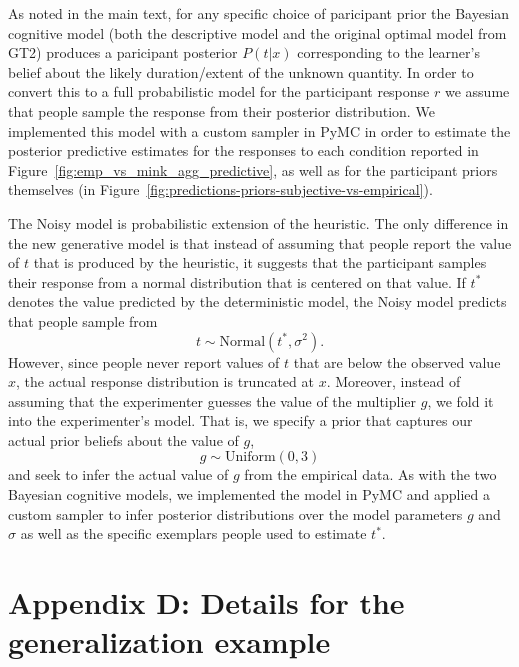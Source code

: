 As noted in the main text, for any specific choice of paricipant prior the Bayesian cognitive model (both the descriptive model and the original optimal model from GT2) produces a paricipant posterior $P(t|x)$ corresponding to the learner's belief about the likely duration/extent of the unknown quantity. In order to convert this to a full probabilistic model for the participant response $r$ we assume that people sample the response from their posterior distribution. We implemented this model with a custom sampler in PyMC in order to estimate the posterior predictive estimates for the responses to each condition reported in Figure~\ref{fig:emp_vs_mink_agg_predictive}, as well as for the participant priors themselves (in Figure~\ref{fig:predictions-priors-subjective-vs-empirical}). 

The Noisy \mink model is probabilistic extension of the \mink heuristic. The only difference in the new generative model is that instead of assuming that people report the value of $t$ that is produced by the \mink heuristic, it suggests that the participant samples their response from a normal distribution that is centered on that value. If $t^*$ denotes the value predicted by the deterministic \mink model, the Noisy \mink model predicts that people sample from 
\begin{equation}
t \sim \mbox{Normal}(t^*,\sigma^2).
\end{equation}
However, since people never report values of $t$ that are below the observed value $x$, the actual response distribution is truncated at $x$. Moreover, instead of assuming that the experimenter guesses the value of the multiplier $g$, we fold it into the experimenter's model. That is, we specify a prior that captures our actual prior beliefs about the value of $g$, 
\begin{equation}
g \sim \mathrm{Uniform}(0,3)
\end{equation}
and seek to infer the actual value of $g$ from the empirical data. As with the two Bayesian cognitive models, we implemented the model in PyMC and applied a custom sampler to infer posterior distributions over the model parameters $g$ and $\sigma$ as well as the specific exemplars people used to estimate $t^*$.

\section{Appendix D: Details for the generalization example}

